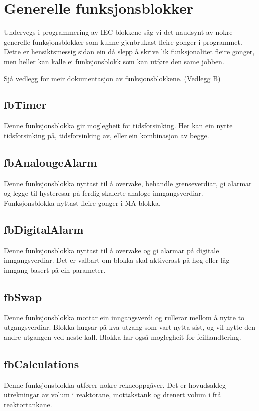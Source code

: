 \section{Generelle funksjonsblokker}
\thispagestyle{fancy}

Undervegs i programmering av \gls{IEC}-blokkene såg vi det naudsynt av nokre generelle funksjonsblokker
som kunne gjenbrukast fleire gonger i programmet. Dette er hensiktsmessig sidan ein då slepp å skrive lik 
funksjonalitet fleire gonger, men heller kan kalle ei funksjonsblokk som kan utføre den same jobben.

Sjå vedlegg for meir dokumentasjon av funksjonsblokkene. (Vedlegg B)

\subsection{fbTimer}
Denne funksjonsblokka gir moglegheit for tidsforsinking.
Her kan ein nytte tidsforsinking på, tidsforsinking av, eller ein kombinasjon av begge.

\subsection{fbAnalougeAlarm}
Denne funksjonsblokka nyttast til å overvake, behandle grenseverdiar, 
gi alarmar og legge til hysteresar på ferdig skalerte analoge inngangsverdiar.
Funksjonsblokka nyttast fleire gonger i MA blokka.

\subsection{fbDigitalAlarm}
Denne funksjonsblokka nyttast til å overvake og gi alarmar på digitale inngangsverdiar. 
Det er valbart om blokka skal aktiverast på høg eller låg inngang basert på ein parameter.

\subsection{fbSwap}\label{sec:1}
Denne funksjonsblokka mottar ein inngangsverdi og rullerar mellom å nytte to utgangsverdiar. Blokka hugsar på kva utgang som vart nytta sist,
og vil nytte den andre utgangen ved neste kall. Blokka har også moglegheit for feilhandtering.

\subsection{fbCalculations}
Denne funksjonsblokka utfører nokre rekneoppgåver. 
Det er hovudsakleg utrekningar av volum i reaktorane, mottakstank og drenert volum i frå reaktortankane.

